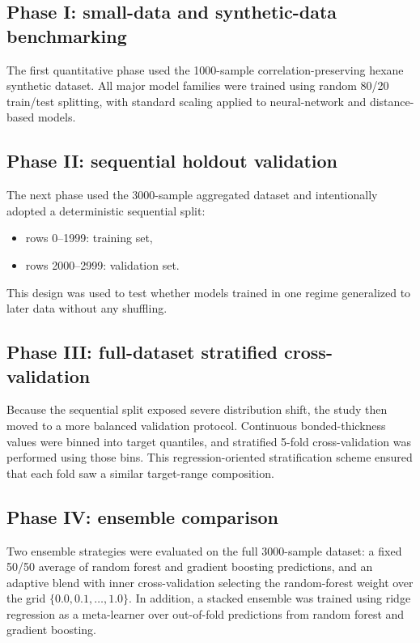 \documentclass[11pt]{article}
\begin{document}
\subsection{Phase I: small-data and synthetic-data benchmarking}
The first quantitative phase used the 1000-sample correlation-preserving hexane synthetic dataset. All major model families were trained using random 80/20 train/test splitting, with standard scaling applied to neural-network and distance-based models.

\subsection{Phase II: sequential holdout validation}
The next phase used the 3000-sample aggregated dataset and intentionally adopted a deterministic sequential split:
\begin{itemize}
    \item rows 0--1999: training set,
    \item rows 2000--2999: validation set.
\end{itemize}
This design was used to test whether models trained in one regime generalized to later data without any shuffling.

\subsection{Phase III: full-dataset stratified cross-validation}
Because the sequential split exposed severe distribution shift, the study then moved to a more balanced validation protocol. Continuous bonded-thickness values were binned into target quantiles, and stratified 5-fold cross-validation was performed using those bins. This regression-oriented stratification scheme ensured that each fold saw a similar target-range composition.

\subsection{Phase IV: ensemble comparison}
Two ensemble strategies were evaluated on the full 3000-sample dataset:
a fixed 50/50 average of random forest and gradient boosting predictions,
and an adaptive blend with inner cross-validation selecting the
random-forest weight over the grid $\{0.0, 0.1, \ldots, 1.0\}$.
In addition, a stacked ensemble was trained using ridge regression as a meta-learner over out-of-fold predictions from random forest and gradient boosting.
\end{document}
